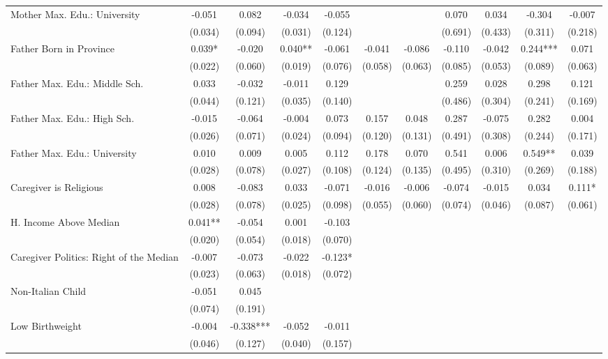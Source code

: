\begin{tabular}{lcccccccccc}
Mother Max. Edu.: University & -0.051 & 0.082 & -0.034 & -0.055 &  &  & 0.070 & 0.034 & -0.304 & -0.007 \\
 & (0.034) & (0.094) & (0.031) & (0.124) &  &  & (0.691) & (0.433) & (0.311) & (0.218) \\
Father Born in Province & 0.039* & -0.020 & 0.040** & -0.061 & -0.041 & -0.086 & -0.110 & -0.042 & 0.244*** & 0.071 \\
 & (0.022) & (0.060) & (0.019) & (0.076) & (0.058) & (0.063) & (0.085) & (0.053) & (0.089) & (0.063) \\
Father Max. Edu.: Middle Sch. & 0.033 & -0.032 & -0.011 & 0.129 &  &  & 0.259 & 0.028 & 0.298 & 0.121 \\
 & (0.044) & (0.121) & (0.035) & (0.140) &  &  & (0.486) & (0.304) & (0.241) & (0.169) \\
Father Max. Edu.: High Sch. & -0.015 & -0.064 & -0.004 & 0.073 & 0.157 & 0.048 & 0.287 & -0.075 & 0.282 & 0.004 \\
 & (0.026) & (0.071) & (0.024) & (0.094) & (0.120) & (0.131) & (0.491) & (0.308) & (0.244) & (0.171) \\
Father Max. Edu.: University & 0.010 & 0.009 & 0.005 & 0.112 & 0.178 & 0.070 & 0.541 & 0.006 & 0.549** & 0.039 \\
 & (0.028) & (0.078) & (0.027) & (0.108) & (0.124) & (0.135) & (0.495) & (0.310) & (0.269) & (0.188) \\
Caregiver is Religious & 0.008 & -0.083 & 0.033 & -0.071 & -0.016 & -0.006 & -0.074 & -0.015 & 0.034 & 0.111* \\
 & (0.028) & (0.078) & (0.025) & (0.098) & (0.055) & (0.060) & (0.074) & (0.046) & (0.087) & (0.061) \\
H. Income Above Median & 0.041** & -0.054 & 0.001 & -0.103 &  &  &  &  &  &  \\
 & (0.020) & (0.054) & (0.018) & (0.070) &  &  &  &  &  &  \\
Caregiver Politics: Right of the Median & -0.007 & -0.073 & -0.022 & -0.123* &  &  &  &  &  &  \\
 & (0.023) & (0.063) & (0.018) & (0.072) &  &  &  &  &  &  \\
Non-Italian Child & -0.051 & 0.045 &  &  &  &  &  &  &  &  \\
 & (0.074) & (0.191) &  &  &  &  &  &  &  &  \\
Low Birthweight & -0.004 & -0.338*** & -0.052 & -0.011 &  &  &  &  &  &  \\
 & (0.046) & (0.127) & (0.040) & (0.157) &  &  &  &  &  &  \\

\end{tabular}
